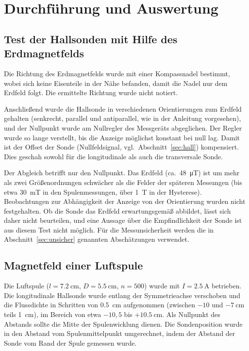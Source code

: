 \documentclass[a4paper,11pt]{article}
\begin{document}
\clearpage

\section{Durchführung und Auswertung}

\subsection{Test der Hallsonden mit Hilfe des Erdmagnetfelds}
\label{sec:erde}
Die Richtung des Erdmagnetfelds wurde mit einer Kompassnadel bestimmt, wobei
sich keine Eisenteile in der Nähe befanden, damit die Nadel nur dem
Erdfeld folgt. Die ermittelte Richtung wurde nicht notiert.

Anschließend wurde die Hallsonde in verschiedenen Orientierungen zum Erdfeld
gehalten (senkrecht, parallel und antiparallel, wie in der Anleitung
vorgesehen), und der Nullpunkt wurde am Nullregler des Messgeräts abgeglichen.
Der Regler wurde so lange verstellt, bis die Anzeige möglichst konstant bei null
lag. Damit ist der Offset der Sonde (Nullfeldsignal, vgl.\
Abschnitt~\ref{sec:hall}) kompensiert. Dies geschah sowohl für die longitudinale
als auch die transversale Sonde.

Der Abgleich betrifft nur den Nullpunkt. Das Erdfeld (ca.\ \SI{48}{\micro\tesla})
ist um mehr als zwei Größenordnungen schwächer als die Felder der späteren
Messungen (bis etwa \SI{30}{\milli\tesla} in den Spulenmessungen, über
\SI{1}{\tesla} in der Hysterese). Beobachtungen zur Abhängigkeit der Anzeige von
der Orientierung wurden nicht festgehalten. Ob die Sonde das Erdfeld
erwartungsgemäß abbildet, lässt sich daher nicht beurteilen, und eine Aussage
über die Empfindlichkeit der Sonde ist aus diesem Test nicht möglich. Für die
Messunsicherheit werden die in Abschnitt~\ref{sec:unsicher} genannten
Abschätzungen verwendet.

\subsection{Magnetfeld einer Luftspule}
\label{sec:luft}
Die Luftspule ($l=\SI{7.2}{\centi\meter}$, $D=\SI{5.5}{\centi\meter}$, $n=500$)
wurde mit $I=\SI{2.5}{\ampere}$ betrieben. Die longitudinale Hallsonde wurde
entlang der Symmetrieachse verschoben und die Flussdichte in Schritten von
\SI{0.5}{\centi\meter} aufgenommen (zwischen $-10$ und $-\SI{7}{\centi\meter}$
teils \SI{1}{\centi\meter}), im Bereich von etwa $-10{,}5$ bis
$+\SI{10.5}{\centi\meter}$. Als Nullpunkt des Abstands sollte die Mitte der
Spulenwicklung dienen. Die Sondenposition wurde in den Abstand vom
Spulenmittelpunkt umgerechnet, indem der Abstand der Sonde vom Rand der Spule
gemessen wurde.
\end{document}

